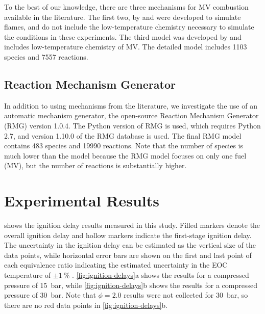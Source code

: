 \documentclass[12pt]{../ussci}
\begin{document}
To the best of our knowledge, there are three mechanisms for MV combustion
available in the literature. The first two, by \textcite{Dmitriev2015} and
\textcite{Korobeinichev2015} were developed to simulate flames, and do not
include the low-temperature chemistry necessary to simulate the conditions in
these experiments. The third model was developed by \textcite{Dievart2013} and
includes low-temperature chemistry of MV.
The detailed \textcite{Dievart2013} model includes 1103 species and 7557
reactions.

\subsection{Reaction Mechanism Generator}\label{sec:reaction-mechanism-generator}

In addition to using mechanisms from the literature, we investigate the use of
an automatic mechanism generator, the open-source Reaction Mechanism Generator
(RMG) \autocite{Allen2012} version 1.0.4. The Python version of RMG is used,
which requires Python 2.7, and version 1.10.0 of the RMG database is used. The
final RMG model contains 483 species and 19990 reactions. Note that the number
of species is much lower than the \textcite{Dievart2013} model because the RMG
model focuses on only one fuel (MV), but the number of reactions is
substantially higher.

\section{Experimental Results}\label{sec:experimental-results}

 shows the ignition delay results measured in this
study. Filled markers denote the overall ignition delay and hollow markers
indicate the first-stage ignition delay. The uncertainty in the ignition delay
can be estimated as the vertical size of the data points, while horizontal error
bars are shown on the first and last point of each equivalence ratio indicating
the estimated uncertainty in the EOC temperature of $\pm\SI{1}{\percent}$
\cite{Weber2015}. \cref{fig:ignition-delays}a shows the results for a compressed
pressure of \SI{15}{\bar}, while \cref{fig:ignition-delays}b shows the results
for a compressed pressure of \SI{30}{\bar}. Note that $\phi=2.0$ results were
not collected for \SI{30}{\bar}, so there are no red data points in
\cref{fig:ignition-delays}b.
\end{document}

